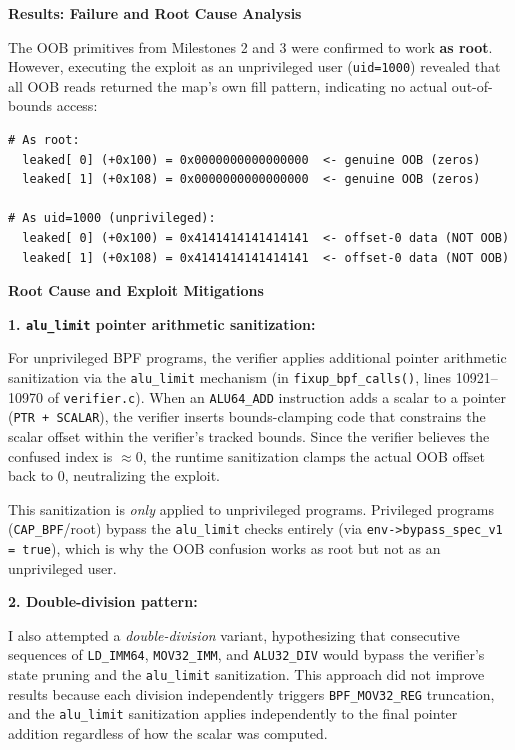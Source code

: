 \textbf{Results: Failure and Root Cause Analysis}

The OOB primitives from Milestones 2 and 3 were confirmed to work \textbf{as root}. However, executing the exploit as an unprivileged user (\texttt{uid=1000}) revealed that all OOB reads returned the map's own fill pattern, indicating no actual out-of-bounds access:

\begin{lstlisting}[style=log,caption={OOB comparison: root vs. unprivileged on kernel 5.10.15}]
# As root:
  leaked[ 0] (+0x100) = 0x0000000000000000  <- genuine OOB (zeros)
  leaked[ 1] (+0x108) = 0x0000000000000000  <- genuine OOB (zeros)

# As uid=1000 (unprivileged):
  leaked[ 0] (+0x100) = 0x4141414141414141  <- offset-0 data (NOT OOB)
  leaked[ 1] (+0x108) = 0x4141414141414141  <- offset-0 data (NOT OOB)
\end{lstlisting}

\textbf{Root Cause and Exploit Mitigations}

\textbf{1. \texttt{alu\_limit} pointer arithmetic sanitization:}

For unprivileged BPF programs, the verifier applies additional pointer arithmetic sanitization via the \texttt{alu\_limit} mechanism (in \texttt{fixup\_bpf\_calls()}, lines 10921--10970 of \texttt{verifier.c}). When an \texttt{ALU64\_ADD} instruction adds a scalar to a pointer (\texttt{PTR + SCALAR}), the verifier inserts bounds-clamping code that constrains the scalar offset within the verifier's tracked bounds. Since the verifier believes the confused index is $\approx 0$, the runtime sanitization clamps the actual OOB offset back to 0, neutralizing the exploit.

This sanitization is \emph{only} applied to unprivileged programs. Privileged programs (\texttt{CAP\_BPF}/root) bypass the \texttt{alu\_limit} checks entirely (via \texttt{env->bypass\_spec\_v1 = true}), which is why the OOB confusion works as root but not as an unprivileged user.

\textbf{2. Double-division pattern:}

I also attempted a \emph{double-division} variant, hypothesizing that consecutive sequences of \texttt{LD\_IMM64}, \texttt{MOV32\_IMM}, and \texttt{ALU32\_DIV} would bypass the verifier's state pruning and the \texttt{alu\_limit} sanitization. This approach did not improve results because each division independently triggers \texttt{BPF\_MOV32\_REG} truncation, and the \texttt{alu\_limit} sanitization applies independently to the final pointer addition regardless of how the scalar was computed.

